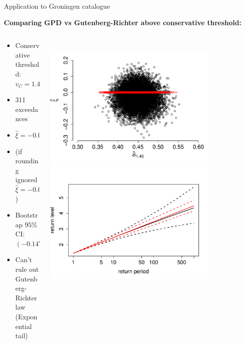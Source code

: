 \begin{frame}{Application to Groningen catalogue}

\textbf{Comparing GPD vs Gutenberg-Richter above conservative threshold:}
\begin{columns}
\begin{column}{0.55\textwidth}
\begin{itemize}
\item Conservative threshold: $v_C=1.45 M_L$
\item 311 exceedances
\item $\hat{\xi}=-0.018$ 
\item (if rounding ignored $\hat{\xi}=-0.027$)
\item Bootstrap $95\%$ CI:   $(-0.147; 0.086)$
\item Can't rule out Gutenberg-Richter law (Exponential tail)
\end{itemize}
\end{column}
\begin{column}{0.45\textwidth}
\\
\vspace{3em}
\includegraphics[width = 0.8\textwidth]{groningen_application/motiving_GPD_over_exponential/groningen_conservative_boot_mles.pdf}
\includegraphics[width = 0.8\textwidth]{groningen_application/motiving_GPD_over_exponential/return_levels_conservative.pdf}
\end{column}
\end{columns}
\end{frame} 

